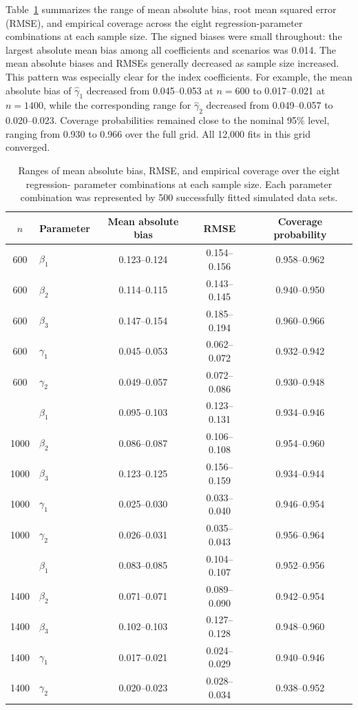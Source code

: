 Table~\ref{tab:betaGridSummary} summarizes the range of mean absolute bias,
root mean squared error (RMSE), and empirical coverage across the eight
regression-parameter combinations at each sample size. The signed biases were
small throughout: the largest absolute mean bias among all coefficients and
scenarios was 0.014. The mean absolute biases and RMSEs generally decreased as
sample size increased. This pattern was especially clear for the index
coefficients. For example, the mean absolute bias of $\hat\gamma_1$ decreased
from 0.045--0.053 at $n=600$ to 0.017--0.021 at $n=1400$, while the
corresponding range for $\hat\gamma_2$ decreased from 0.049--0.057 to
0.020--0.023. Coverage probabilities remained close to the nominal 95\%
level, ranging from 0.930 to 0.966 over the full grid. All 12,000 fits in this
grid converged.

\begin{table}[!htbp]
\caption[Simulation performance over the regression-parameter grid]{Ranges of
mean absolute bias, RMSE, and empirical coverage over the eight regression-
parameter combinations at each sample size. Each parameter combination was
represented by 500 successfully fitted simulated data sets.}
\label{tab:betaGridSummary}
\centering
\scriptsize
\begin{tabular}{clccc}
\toprule
$n$ & Parameter & Mean absolute bias & RMSE & Coverage probability \\
\midrule
600  & $\beta_1$  & 0.123--0.124 & 0.154--0.156 & 0.958--0.962 \\
600  & $\beta_2$  & 0.114--0.115 & 0.143--0.145 & 0.940--0.950 \\
600  & $\beta_3$  & 0.147--0.154 & 0.185--0.194 & 0.960--0.966 \\
600  & $\gamma_1$ & 0.045--0.053 & 0.062--0.072 & 0.932--0.942 \\
600  & $\gamma_2$ & 0.049--0.057 & 0.072--0.086 & 0.930--0.948 \\
\addlinespace
1000 & $\beta_1$  & 0.095--0.103 & 0.123--0.131 & 0.934--0.946 \\
1000 & $\beta_2$  & 0.086--0.087 & 0.106--0.108 & 0.954--0.960 \\
1000 & $\beta_3$  & 0.123--0.125 & 0.156--0.159 & 0.934--0.944 \\
1000 & $\gamma_1$ & 0.025--0.030 & 0.033--0.040 & 0.946--0.954 \\
1000 & $\gamma_2$ & 0.026--0.031 & 0.035--0.043 & 0.956--0.964 \\
\addlinespace
1400 & $\beta_1$  & 0.083--0.085 & 0.104--0.107 & 0.952--0.956 \\
1400 & $\beta_2$  & 0.071--0.071 & 0.089--0.090 & 0.942--0.954 \\
1400 & $\beta_3$  & 0.102--0.103 & 0.127--0.128 & 0.948--0.960 \\
1400 & $\gamma_1$ & 0.017--0.021 & 0.024--0.029 & 0.940--0.946 \\
1400 & $\gamma_2$ & 0.020--0.023 & 0.028--0.034 & 0.938--0.952 \\
\bottomrule
\end{tabular}
\end{table}

